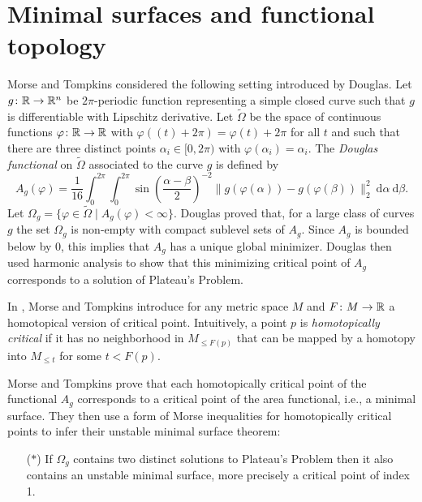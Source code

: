 
\section{Minimal surfaces and functional topology} \label{s:surfaces}

Morse and Tompkins considered the following setting introduced by Douglas.
Let $g \colon \mathbb{R} \to \mathbb{R}^n$ be $2\pi$-periodic function representing a simple closed curve such that $g$ is differentiable with Lipschitz derivative.
Let $\widetilde{\Omega}$ be the space of continuous functions $\varphi \colon \mathbb{R} \to \mathbb{R}$ with $\varphi((t)+2\pi) = \varphi(t) + 2\pi$ for all $t$ and such that there are three distinct points $\alpha_i \in [0,2\pi)$ with $\varphi(\alpha_i)=\alpha_i$.
The \emph{Douglas functional} on $\widetilde \Omega$ associated to the curve $g$ is defined by
\begin{equation*}
A_g(\varphi)=\frac{1}{16}\int_0^{2\pi}\int_0^{2\pi}\sin\left(\frac{\alpha-\beta}{2}\right)^{-2} \! \lVert g(\varphi(\alpha))-g(\varphi(\beta)) \rVert_2^2 \ \mathrm{d}\alpha \ \mathrm{d}\beta.
\end{equation*}
Let $\Omega_g=\{\varphi\in\widetilde\Omega\mid A_g(\varphi)<\infty\}$.
Douglas proved that, for a large class of curves $g$ the set $\Omega_g$ is non-empty with compact sublevel sets of $A_g$.
Since $A_g$ is bounded below by $0$, this implies that $A_g$ has a unique global minimizer.
Douglas then used harmonic analysis to show that this minimizing critical point of $A_g$ corresponds to a solution of Plateau's Problem.

In \cite[p.445]{Morse.1939}, Morse and Tompkins introduce for any metric space $M$ and $F \colon M \to \mathbb{R}$ a homotopical version of critical point.
Intuitively, a point $p$ is \textit{homotopically critical} if it has no neighborhood in $M_{\leq F(p)}$ that can be mapped by a homotopy into $M_{\leq t}$ for some $t<F(p)$.

Morse and Tompkins prove that each homotopically critical point of the functional $A_g$ corresponds to a critical point of the area functional, i.e., a minimal surface.
They then use a form of Morse inequalities for homotopically critical points
to infer their unstable minimal surface theorem:
\begin{itemize}
    \item[($\ast$)] If $\Omega_g$ contains two distinct solutions to Plateau's Problem then it also contains an unstable minimal surface, more precisely a critical point of index 1.
\end{itemize}

